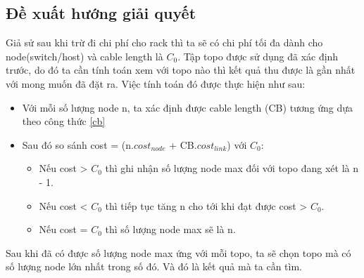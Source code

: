 \documentclass[../report.tex]{subfiles}
\begin{document}
\subsection{Đề xuất hướng giải quyết}
Giả sử sau khi trừ đi chi phí cho rack thì ta sẽ có chi phí tối đa dành cho node(switch/host) và cable length là $C_0$. Tập topo được sử dụng đã xác định trước, do đó ta cần tính toán xem với topo nào thì kết quả thu được là gần nhất với mong muốn đã đặt ra. Việc tính toán đó được thực hiện như sau:
\begin{itemize}
    \item Với mỗi số lượng node n, ta xác định được cable length (CB) tương ứng dựa theo công thức \eqref{cb}
    \item Sau đó so sánh cost = (n.$cost_{node}$ + CB.$cost_{link}$) với $C_0$:
        \begin{itemize}
            \item Nếu cost > $C_0$ thì ghi nhận số lượng node max đối với topo đang xét là n - 1.
            \item Nếu cost < $C_0$ thì tiếp tục tăng n cho tới khi đạt được cost > $C_0$.
            \item Nếu cost = $C_0$ thì số lượng node max sẽ là n.
        \end{itemize}
\end{itemize}
Sau khi đã có được số lượng node max ứng với mỗi topo, ta sẽ chọn topo mà có số lượng node lớn nhất trong số đó. Và đó là kết quả mà ta cần tìm.
\end{document}
